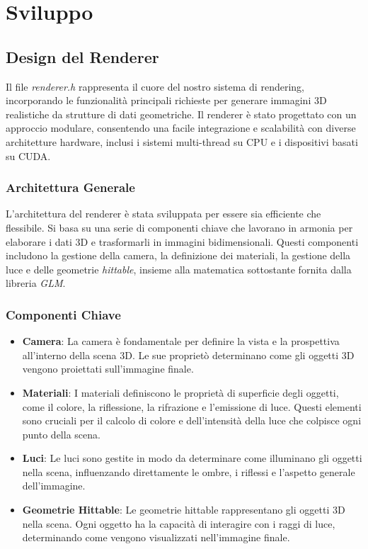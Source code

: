 \documentclass[12pt]{article}
\begin{document}
\section{Sviluppo}


\subsection{Design del Renderer}
Il file \textit{renderer.h} rappresenta il cuore del nostro sistema di rendering, incorporando le funzionalità principali richieste per generare immagini 3D realistiche da strutture di dati geometriche. Il renderer è stato progettato con un approccio modulare, consentendo una facile integrazione e scalabilità con diverse architetture hardware, inclusi i sistemi multi-thread su CPU e i dispositivi basati su CUDA.

\subsubsection{Architettura Generale}
L'architettura del renderer è stata sviluppata per essere sia efficiente che flessibile. Si basa su una serie di componenti chiave che lavorano in armonia per elaborare i dati 3D e trasformarli in immagini bidimensionali.
Questi componenti includono la gestione della camera, la definizione dei materiali, la gestione della luce e delle geometrie \textit{hittable}, insieme alla matematica sottostante fornita dalla libreria \textit{GLM}.

\subsubsection{Componenti Chiave}
\begin{itemize}
\item \textbf{Camera}: La camera è fondamentale per definire la vista e la prospettiva all'interno della scena 3D. Le sue proprietò determinano come gli oggetti 3D vengono proiettati sull'immagine finale.

\item \textbf{Materiali}: I materiali definiscono le proprietà di superficie degli oggetti, come il colore, la riflessione, la rifrazione e l'emissione di luce. Questi elementi sono cruciali per il calcolo di colore e dell'intensità della luce che colpisce ogni punto della scena.

\item \textbf{Luci}: Le luci sono gestite in modo da determinare come illuminano gli oggetti nella scena, influenzando direttamente le ombre, i riflessi e l'aspetto generale dell'immagine.

\item \textbf{Geometrie Hittable}: Le geometrie hittable rappresentano gli oggetti 3D nella scena. Ogni oggetto ha la capacità di interagire con i raggi di luce, determinando come vengono visualizzati nell'immagine finale.
\end{itemize}
\end{document}
